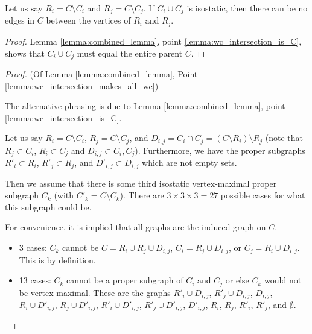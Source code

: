 \begin{observation}\label{observation:no_edges_between_diff}
Let us say $R_i=C\setminus C_i$ and $R_j=C\setminus C_j$. If $C_i\cup C_j$ is isostatic, then there can be no edges in $C$ between the vertices of $R_i$ and $R_j$.
\end{observation}

\begin{proof}
Lemma \ref{lemma:combined_lemma}, point \ref{lemma:wc_intersection_is_C}, shows that $C_i\cup C_j$ must equal the entire parent $C$.
\end{proof}


\begin{proof} (Of Lemma \ref{lemma:combined_lemma}, Point \ref{lemma:wc_intersection_makes_all_wc})

The alternative phrasing is due to Lemma \ref{lemma:combined_lemma}, point \ref{lemma:wc_intersection_is_C}.

Let us say $R_i=C\setminus C_i$, $R_j=C\setminus C_j$, and $D_{i,j}=C_i\cap C_j=(C\setminus R_i)\setminus R_j$ (note that $R_j\subset C_i$, $R_i\subset C_j$ and $D_{i,j}\subset C_i,C_j$). Furthermore, we have the proper subgraphs $R'_i\subset R_i$, $R'_j\subset R_j$, and $D'_{i,j}\subset D_{i,j}$ which are not empty sets.

Then we assume that there is some third isostatic vertex-maximal proper subgraph $C_k$ (with $C'_k=C\setminus C_k$). There are $3\times 3\times 3 = 27$ possible cases for what this subgraph could be.

For convenience, it is implied that all graphs are the induced graph on $C$.


\newcommand{\inducedOnC}[1]{#1}

\begin{itemize}
    \item 3 cases: $C_k$ cannot be $C=\inducedOnC{R_i\cup R_j\cup D_{i,j}}$, $C_i=\inducedOnC{R_j\cup D_{i,j}}$, or $C_j=\inducedOnC{R_i\cup D_{i,j}}$. This is by definition.

    \item 13 cases: $C_k$ cannot be a proper subgraph of $C_i$ and $C_j$ or else $C_k$ would not be vertex-maximal. These are the graphs $\inducedOnC{R'_i\cup D_{i,j}}$, $\inducedOnC{R'_j\cup D_{i,j}}$, $\inducedOnC{ D_{i,j}}$, $\inducedOnC{R_i\cup D'_{i,j}}$, $\inducedOnC{R_j\cup D'_{i,j}}$, $\inducedOnC{R'_i\cup D'_{i,j}}$, $\inducedOnC{R'_j\cup D'_{i,j}}$, $\inducedOnC{ D'_{i,j}}$, $\inducedOnC{R_i}$, $\inducedOnC{R_j}$, $\inducedOnC{R'_i}$, $\inducedOnC{R'_j}$, and $\inducedOnC{\emptyset}$.


\end{itemize}
\end{proof}
